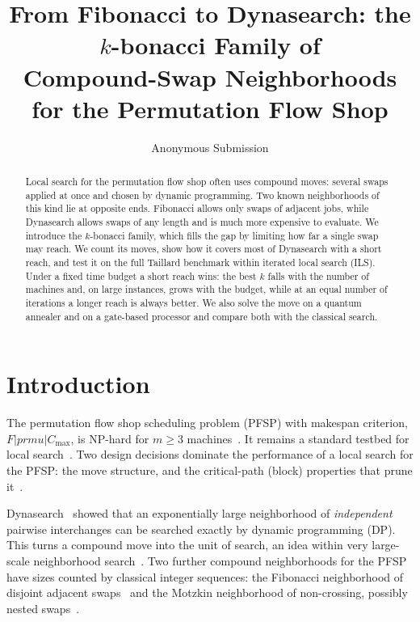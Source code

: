 \documentclass[letterpaper]{article} %
\title{From Fibonacci to Dynasearch: the $k$-bonacci Family of\\
Compound-Swap Neighborhoods for the Permutation Flow Shop}
\author{Anonymous Submission}
\theoremstyle{definition}
\begin{document}
\maketitle

\begin{abstract}
Local search for the permutation flow shop often uses compound moves:
several swaps applied at once and chosen by dynamic programming. Two
known neighborhoods of this kind lie at opposite ends. Fibonacci allows
only swaps of adjacent jobs, while Dynasearch allows swaps of any length
and is much more expensive to evaluate. We introduce the $k$-bonacci
family, which fills the gap by limiting how far a single swap may reach.
We count its moves, show how it covers most of Dynasearch with a short
reach, and test it on the full Taillard benchmark within iterated local
search (ILS). Under a fixed time budget a short reach wins: the best $k$ falls
with the number of machines and, on large instances, grows with the budget, while at an equal
number of iterations a longer reach is always better. We also solve the
move on a quantum annealer and on a gate-based processor and compare
both with the classical search.
\end{abstract}

\section{Introduction}

The permutation flow shop scheduling problem (PFSP) with makespan
criterion, $F|prmu|C_{\max}$, is NP-hard for $m\geq 3$
machines~\cite{garey1976}. It remains a standard testbed for local
search~\cite{taillard1993,ruizmaroto2005,ruiz2007,wodecki2002parallel}. Two design decisions dominate the
performance of a local search for the PFSP: the move structure, and the
critical-path (block) properties that prune it~\cite{nowicki1996,grabowski2004}.

Dynasearch~\cite{congram2002} showed that an exponentially large
neighborhood of \emph{independent} pairwise interchanges can be searched
exactly by dynamic programming (DP). This turns a compound move into the unit
of search, an idea within very large-scale neighborhood search~\cite{ahuja2002survey}. Two further compound neighborhoods for the PFSP
have sizes counted by classical integer sequences: the Fibonacci
neighborhood of disjoint adjacent swaps~\cite{wojewodzki2026icaisc,bozejko2026new}
and the Motzkin neighborhood of non-crossing, possibly nested
swaps~\cite{wojewodzki2026soco}.
\end{document}
